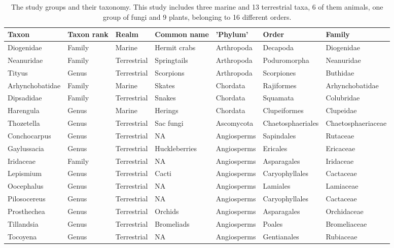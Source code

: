 \documentclass[
  12pt,
]{article}
\begin{document}
\begin{landscape}
\begin{table}
\caption{\label{tab:tabletaxa}The study groups and their taxonomy. This study includes three marine and 13 terrestrial taxa, 6 of them animals, one group of fungi and 9 plants, belonging to 16 different orders.}
\centering
\fontsize{11}{13}\selectfont
\begin{tabular}[t]{>{\raggedright\arraybackslash}p{2.5cm}>{\raggedright\arraybackslash}p{2cm}>{\raggedright\arraybackslash}p{2cm}>{\raggedright\arraybackslash}p{2.5cm}>{\raggedright\arraybackslash}p{2.5cm}ll}
\toprule
Taxon & Taxon rank & Realm & Common name & 'Phylum' & Order & Family\\
\midrule
Diogenidae & Family & Marine & Hermit crabs & Arthropoda & Decapoda & Diogenidae\\
Neanuridae & Family & Terrestrial & Springtails & Arthropoda & Poduromorpha & Neanuridae\\
Tityus & Genus & Terrestrial & Scorpions & Arthropoda & Scorpiones & Buthidae\\
Arhynchobatidae & Family & Marine & Skates & Chordata & Rajiformes & Arhynchobatidae\\
Dipsadidae & Family & Terrestrial & Snakes & Chordata & Squamata & Colubridae\\
\addlinespace
Harengula & Genus & Marine & Herings & Chordata & Clupeiformes & Clupeidae\\
\hline
Thozetella & Genus & Terrestrial & Sac fungi & Ascomycota & Chaetosphaeriales & Chaetosphaeriaceae\\
\hline
Conchocarpus & Genus & Terrestrial & NA & Angiosperms & Sapindales & Rutaceae\\
Gaylussacia & Genus & Terrestrial & Huckleberries & Angiosperms & Ericales & Ericaceae\\
Iridaceae & Family & Terrestrial & NA & Angiosperms & Asparagales & Iridaceae\\
\addlinespace
Lepismium & Genus & Terrestrial & Cacti & Angiosperms & Caryophyllales & Cactaceae\\
Oocephalus & Genus & Terrestrial & NA & Angiosperms & Lamiales & Lamiaceae\\
Pilosocereus & Genus & Terrestrial & NA & Angiosperms & Caryophyllales & Cactaceae\\
Prosthechea & Genus & Terrestrial & Orchids & Angiosperms & Asparagales & Orchidaceae\\
Tillandsia & Genus & Terrestrial & Bromeliads & Angiosperms & Poales & Bromeliaceae\\
\addlinespace
Tocoyena & Genus & Terrestrial & NA & Angiosperms & Gentianales & Rubiaceae\\
\bottomrule
\end{tabular}
\end{table}
\end{landscape}
\end{document}
